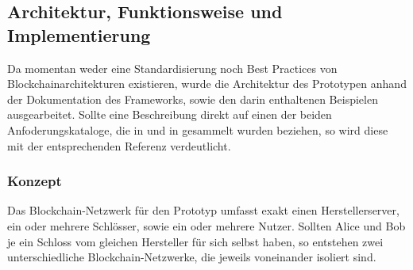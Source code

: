 \newpage
\subsection{Architektur, Funktionsweise und Implementierung}
\label{sec:prototype_arch} 
    Da momentan weder eine Standardisierung noch Best Practices von Blockchainarchitekturen existieren, wurde die Architektur des Prototypen anhand der Dokumentation des Frameworks\cite{ComposerDocs}, sowie den darin enthaltenen Beispielen ausgearbeitet. 
    Sollte eine Beschreibung direkt auf einen der beiden Anfoderungskataloge, die in  und in  gesammelt wurden beziehen, so wird diese mit der entsprechenden Referenz verdeutlicht.
    
    \subsubsection{Konzept}
        Das Blockchain-Netzwerk für den Prototyp umfasst exakt einen Herstellerserver, ein oder mehrere Schlösser, sowie ein oder mehrere Nutzer. 
        Sollten Alice und Bob je ein Schloss vom gleichen Hersteller für sich selbst haben, so entstehen zwei unterschiedliche Blockchain-Netzwerke, die jeweils voneinander isoliert sind. 
        
        
